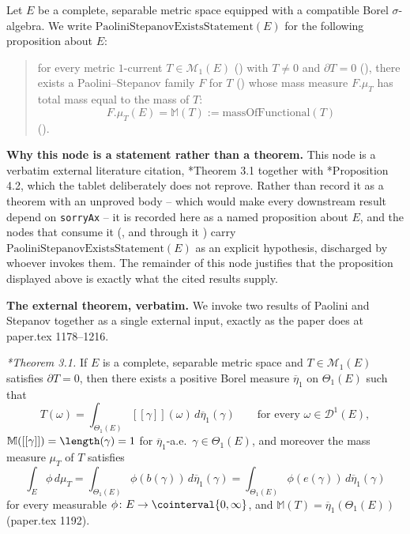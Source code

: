\begin{definition}
  Let $E$ be a complete, separable metric space equipped with a compatible Borel $\sigma$-algebra.
  We write $\mathrm{PaoliniStepanovExistsStatement}(E)$ for the following proposition about $E$:
  \begin{quote}
    for every metric $1$-current $T \in \mathcal{M}_1(E)$ () with $T \neq
    0$ and $\partial T = 0$ (), there exists a Paolini--Stepanov family $F$
    for $T$ () whose mass measure $F.\mu_T$ has total mass equal to the mass of
    $T$:
    \[
      F.\mu_T(E) = \mathbb{M}(T) := \mathrm{massOfFunctional}(T)
    \]
    ().
  \end{quote}

  \textbf{Why this node is a statement rather than a theorem.} This node is a verbatim external
  literature citation, \cite{PS}*{Theorem 3.1} together with \cite{PS}*{Proposition 4.2}, which
  the tablet deliberately does not reprove. Rather than record it as a theorem with an unproved
  body -- which would make every downstream result depend on \texttt{sorryAx} -- it is recorded
  here as a named proposition about $E$, and the nodes that consume it (, and
  through it ) carry $\mathrm{PaoliniStepanovExistsStatement}(E)$ as
  an explicit hypothesis, discharged by whoever invokes them. The remainder of this node justifies
  that the proposition displayed above is exactly what the cited results supply.

  \textbf{The external theorem, verbatim.} We invoke two results of Paolini and Stepanov together
  as a single external input, exactly as the paper does at paper.tex 1178--1216.

  \emph{\cite{PS}*{Theorem 3.1}.} If $E$ is a complete, separable metric space and $T \in
  \mathcal{M}_1(E)$ satisfies $\partial T = 0$, then there exists a positive Borel measure
  $\overline{\eta}_1$ on $\Theta_1(E)$ such that
  \[
    T(\omega) = \int_{\Theta_1(E)} [[\gamma]](\omega) \, d\overline{\eta}_1(\gamma)
    \qquad \text{for every } \omega \in \mathcal{D}^1(E)
    ,
    \tag{PaoT}
  \]
  $\mathbb{M}([[\gamma]]) = \length(\gamma) = 1$ for $\overline{\eta}_1$-a.e.\ $\gamma \in
  \Theta_1(E)$, and moreover the mass measure $\mu_T$ of $T$ satisfies
  \[
    \int_E \phi \, d\mu_T = \int_{\Theta_1(E)} \phi(b(\gamma)) \, d\overline{\eta}_1(\gamma)
    = \int_{\Theta_1(E)} \phi(e(\gamma)) \, d\overline{\eta}_1(\gamma)
    \tag{Paophi}
  \]
  for every measurable $\phi \colon E \to \cointerval{0,\infty}$, and $\mathbb{M}(T) =
  \overline{\eta}_1(\Theta_1(E))$ (paper.tex 1192).


\end{definition}
